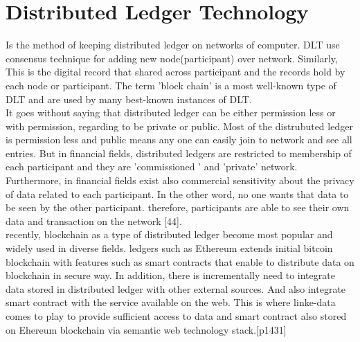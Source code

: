  \section{Distributed Ledger Technology}
 Is the method of keeping distributed ledger on networks of computer. DLT use consensus technique for adding new node(participant) over network. Similarly, This is the digital record that shared across participant and the records hold by each node or participant. The term 'block chain' is a most well-known type of DLT and are used by many best-known instances of DLT.\\
 It goes without saying that distributed ledger can be either permission less or with permission, regarding to be private or public. 
 Most of the distrubuted ledger is permission less and public means any one can easily join to network and see all entries. But in financial fields, distributed ledgers are restricted to membership of each participant and they are 'commissioned ' and 'private' network. Furthermore, in financial fields exist also commercial sensitivity about the privacy of data related to each participant. In the other word, no one wants that data to be seen by the other participant. therefore, participants are able to see their own data and transaction on the network [44].\\
 recently, blockchain as a type of distributed ledger become most popular and widely used in diverse fields. ledgers such as Ethereum extends initial bitcoin blockchain with features such as smart contracts that enable to distribute data on blockchain in secure way.
 In addition, there is incrementally need to integrate data stored in distributed ledger with other external sources. And also integrate smart contract with the service available on the web. This is where linke-data comes to play to provide sufficient access to data and smart contract also stored on Ehereum blockchain via semantic web technology stack.[p1431] 
 

